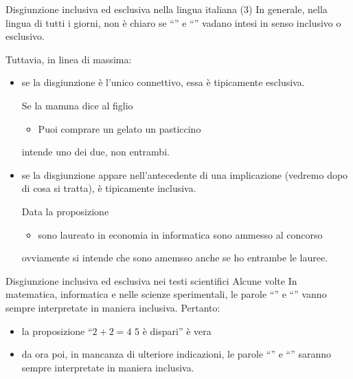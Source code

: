 \documentclass[10pt,dvipsnames]{beamer}
\begin{document}
\begin{frame}{Disgiunzione inclusiva ed esclusiva nella lingua italiana (3)}
    In generale, nella lingua di tutti i giorni, non è chiaro se ``''  e ``'' vadano intesi in senso inclusivo o esclusivo.

    \medskip
    Tuttavia, in linea di massima:
    \begin{itemize}
        \item se la disgiunzione è l'unico connettivo, essa è tipicamente esclusiva.

        \medskip
        Se la mamma dice al figlio
        \begin{itemize}
            \item Puoi comprare un gelato  un pasticcino
        \end{itemize}
        intende uno dei due, non entrambi.

        \pause
        \item se la disgiunzione appare nell'antecedente di una implicazione (vedremo dopo di cosa si tratta), è tipicamente inclusiva.

            \medskip
        Data la proposizione
        \begin{itemize}
            \item {} sono laureato in economia  in informatica sono ammesso al concorso
        \end{itemize}
        ovviamente si intende che sono amemsso anche se ho entrambe le lauree.
    \end{itemize}
\end{frame}

\begin{frame}{Disgiunzione inclusiva ed esclusiva nei testi scientifici}
    Alcune volte
    In matematica, informatica e nelle scienze sperimentali, le parole ``'' e ``'' vanno sempre interpretate in maniera inclusiva. Pertanto:
    \begin{itemize}
        \item la proposizione ``$2 + 2 = 4$  $5$ è dispari'' è vera
        \item da ora poi, in mancanza di ulteriore indicazioni, le parole ``'' e ``'' saranno sempre interpretate in maniera inclusiva.
    \end{itemize}
\end{frame}

\end{document}
